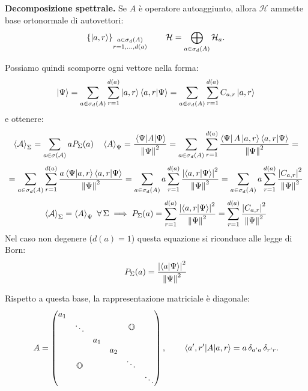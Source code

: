 \begin{theorem}
    {\normalfont\textbf{Decomposizione spettrale.}}
    Se \(A\) è operatore autoaggiunto, allora \(\mathcal{H}\) ammette base ortonormale di autovettori:
    \begin{equation}
        \left\{ \ket{a, r} \right\}_{\substack{a \in \sigma_d(A)\\ r = 1,\dots,d(a)}}
        \qquad
        \mathcal{H} = \bigoplus_{a \in \sigma_d(A)} \mathcal{H}_a.
    \end{equation}
\end{theorem}

Possiamo quindi scomporre ogni vettore nella forma:
\[
    \ket{\Psi} = \sum_{a \in \sigma_d(A)}  \sum_{r=1}^{d(a)} \ket{a,r}\braket{a,r}{\Psi}= \sum_{a \in \sigma_d(A)}\sum_{r=1}^{d(a)}    C_{a,r} \ket{a,r}    
\]
e ottenere:
\[
    \expval{\mathcal{A}}_{\Sigma}= \sum_{a \in \sigma(\mathcal{A})} a P_{\Sigma}(a) \quad \expval{A}_{\Psi} = \frac{\expval{A}{\Psi}}{\norm{\Psi}^2} =
    \sum_{a \in \sigma_d(A)}\sum_{r=1}^{d(a)}\frac{\bra{\Psi}A \ket{a,r}\bra{a,r}\ket{\Psi}}{\norm{\Psi}^2} = 
\]
\[
    = \sum_{a \in \sigma_d(A)} \sum_{r=1}^{d(a)}\frac{a \braket{\Psi}{a,r}\braket{a,r}{\Psi}}{\norm{\Psi}^2}=
    \sum_{a \in \sigma_d(A)} a \sum_{r=1}^{d(a)} \frac{\abs{\braket{a,r}{\Psi}}^2}{\norm{\Psi}^2}
    =\sum_{a \in \sigma_d(A)} a \sum_{r=1}^{d(a)} \frac{\abs{C_{a,r}}^2}{\norm{\Psi}^2}
\]
\[
    \expval{\mathcal{A}}_\Sigma = \expval{A}_\Psi \ \forall\,\Sigma  \implies P_\Sigma(a)   = \sum_{r=1}^{d(a)} \frac{\abs{\braket{a,r}{\Psi}}^2}{\norm{\Psi}^2}=
    \sum_{r=1}^{d(a)} \frac{\abs{C_{a,r}}^2}{\norm{\Psi}^2}
\]
Nel caso non degenere (\(d(a)=1\))  questa equazione si riconduce alle legge di Born: 
\[
    P_\Sigma(a)= \frac{\abs{\braket{a}{\Psi}}^2}{\norm{\Psi}^2}
\]

Rispetto a questa base, la rappresentazione matriciale è diagonale:
\[
A =
\begin{pmatrix}
\begin{matrix}
    a_1& & \\
    & \ddots &\\
    & & a_1
\end{matrix} &\mathbb{O}\\
\mathbb{O} & \begin{matrix}
    a_2& & \\
    & \ddots &\\
    & & \ddots
\end{matrix} 
\end{pmatrix},
\qquad
\matrixel{a',r'}{A}{a,r} = a\,\delta_{a'a}\,\delta_{r'r}.
\]

